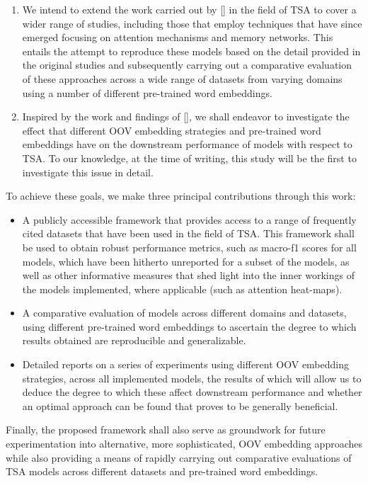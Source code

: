 \documentclass[12pt, a4paper]{report}
\theoremstyle{definition}
\theoremstyle{definition}%
\theoremstyle{definition}%
\theoremstyle{definition}%
\theoremstyle{definition}%
\theoremstyle{definition}%
\renewcommand{\cite}[1]{[\citealp{#1}]}
\begin{document}
\begin{enumerate}
	\item We intend to extend the work carried out by \cite{moore2018} in the field of TSA to cover a wider range of studies, including those that employ techniques that have since emerged focusing on attention mechanisms and memory networks. This entails the attempt to reproduce these models based on the detail provided in the original studies and subsequently carrying out a comparative evaluation of these approaches across a wide range of datasets from varying domains using a number of different pre-trained word embeddings.
	\item Inspired by the work and findings of \cite{bhuwandhingra2017}, we shall endeavor to investigate the effect that different OOV embedding strategies and pre-trained word embeddings have on the downstream performance of models with respect to TSA. To our knowledge, at the time of writing, this study will be the first to investigate this issue in detail.
\end{enumerate}

To achieve these goals, we make three principal contributions through this work:
\begin{itemize}
	\item A publicly accessible framework that provides access to a range of frequently cited datasets that have been used in the field of TSA. This framework shall be used to obtain robust performance metrics, such as macro-f1 scores for all models, which have been hitherto unreported for a subset of the models, as well as other informative measures that shed light into the inner workings of the models implemented, where applicable (such as attention heat-maps).
	\item A comparative evaluation of models across different domains and datasets, using different pre-trained word embeddings to ascertain the degree to which results obtained are reproducible and generalizable.
	\item Detailed reports on a series of experiments using different OOV embedding strategies, across all implemented models, the results of which will allow us to deduce the degree to which these affect downstream performance and whether an optimal approach can be found that proves to be generally beneficial.
\end{itemize}

Finally, the proposed framework shall also serve as groundwork for future experimentation into alternative, more sophisticated, OOV embedding approaches while also providing a means of rapidly carrying out comparative evaluations of TSA models across different datasets and pre-trained word embeddings.
\end{document}
